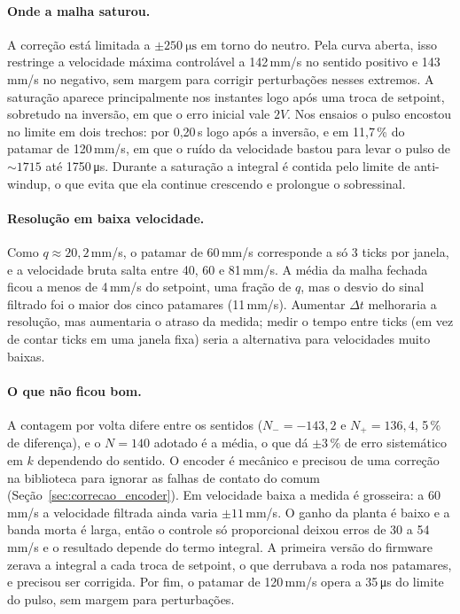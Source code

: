 \documentclass[12pt]{article}
\begin{document}
\paragraph{Onde a malha saturou.} A correção está limitada a $\pm\SI{250}{\micro\second}$ em torno do neutro. Pela curva aberta, isso restringe a velocidade máxima controlável a 142\,mm/s no sentido positivo e 143\,mm/s no negativo, sem margem para corrigir perturbações nesses extremos. A saturação aparece principalmente nos instantes logo após uma troca de setpoint, sobretudo na inversão, em que o erro inicial vale $2V$. Nos ensaios o pulso encostou no limite em dois trechos: por 0,20\,s logo após a inversão, e em 11,7\,\% do patamar de 120\,mm/s, em que o ruído da velocidade bastou para levar o pulso de ${\sim}1715$ até 1750\,\si{\micro\second}. Durante a saturação a integral é contida pelo limite de anti-windup, o que evita que ela continue crescendo e prolongue o sobressinal.

\paragraph{Resolução em baixa velocidade.} Como $q \approx 20{,}2$\,mm/s, o patamar de 60\,mm/s corresponde a só 3 ticks por janela, e a velocidade bruta salta entre 40, 60 e 81\,mm/s. A média da malha fechada ficou a menos de 4\,mm/s do setpoint, uma fração de $q$, mas o desvio do sinal filtrado foi o maior dos cinco patamares (11\,mm/s). Aumentar $\Delta t$ melhoraria a resolução, mas aumentaria o atraso da medida; medir o tempo entre ticks (em vez de contar ticks em uma janela fixa) seria a alternativa para velocidades muito baixas.

\paragraph{O que não ficou bom.} A contagem por volta difere entre os sentidos ($N_- = -143{,}2$ e $N_+ = 136{,}4$, 5\,\% de diferença), e o $N = 140$ adotado é a média, o que dá ${\pm}3\,\%$ de erro sistemático em $k$ dependendo do sentido. O encoder é mecânico e precisou de uma correção na biblioteca para ignorar as falhas de contato do comum (Seção~\ref{sec:correcao_encoder}). Em velocidade baixa a medida é grosseira: a 60\,mm/s a velocidade filtrada ainda varia ${\pm}11$\,mm/s. O ganho da planta é baixo e a banda morta é larga, então o controle só proporcional deixou erros de 30 a 54\,mm/s e o resultado depende do termo integral. A primeira versão do firmware zerava a integral a cada troca de setpoint, o que derrubava a roda nos patamares, e precisou ser corrigida. Por fim, o patamar de 120\,mm/s opera a 35\,\si{\micro\second} do limite do pulso, sem margem para perturbações.
\end{document}
